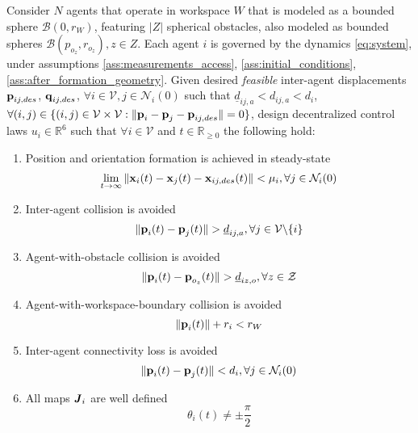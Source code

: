 \begin{bg_box}
\begin{problem}
	Consider $N$ agents that operate in workspace $W$ that is modeled as a bounded
  sphere $\mathcal{B}(0,r_W)$, featuring $|Z|$ spherical obstacles, also modeled
  as bounded spheres $\mathcal{B}(p_{o_z}, r_{o_z}), z \in Z$.
  Each agent $i$ is governed by the dynamics \eqref{eq:system}, under
  assumptions \ref{ass:measurements_access}, \ref{ass:initial_conditions},
  \ref{ass:after_formation_geometry}. Given desired \textit{feasible}
  inter-agent displacements $\bm{\mathbf{p}}_{ij,des}$, $\bm{\mathbf{q}}_{ij,des}$,
  $\forall i \in \mathcal{V}, j \in \mathcal{N}_i(0)$ such that
  $\underline{d}_{ij,a} < d_{ij,a} < d_i$, $\forall (i,j) \in
  \{(i,j) \in \mathcal{V} \times \mathcal{V}:
  \|\bm{\mathbf{p}}_i - \bm{\mathbf{p}}_j - \bm{\mathbf{p}}_{ij,des}\| = 0\}$,
  design decentralized control laws $u_i \in \mathbb{R}^6$ such that
  $\forall i \in \mathcal{V}$ and $t \in \mathbb{R}_{\geq 0}$ the following
  hold:

  \begin{enumerate}

    \item Position and orientation formation is achieved in steady-state
      $$\lim_{t \to \infty} \|\bm{\mathbf{x}}_i(t) - \bm{\mathbf{x}}_j(t) - \bm{\mathbf{x}}_{ij,des}(t)\| < \mu_i,
        \forall j \in \mathcal{N}_i(0)$$

    \item Inter-agent collision is avoided
      $$\|\bm{\mathbf{p}}_i(t) - \bm{\mathbf{p}}_j(t)\| > \underline{d}_{ij,a},
      \forall j \in \mathcal{V} \backslash \{i\}$$

    \item Agent-with-obstacle collision is avoided
      $$\|\bm{\mathbf{p}}_i(t) - \bm{\mathbf{p}}_{o_z}(t)\| > \underline{d}_{iz,o},
      \forall z \in \mathcal{Z}$$

    \item Agent-with-workspace-boundary collision is avoided
      $$\|\bm{\mathbf{p}}_i(t)\| + r_i < r_W$$

    \item Inter-agent connectivity loss is avoided
      $$\|\bm{\mathbf{p}}_i(t) - \bm{\mathbf{p}}_j(t)\| < d_i,
      \forall j \in \mathcal{N}_i(0)$$

    \item All maps $\bm{\mathit{J}}_i$ are well defined
      $$\theta_i(t) \ne \pm \frac{\pi}{2}$$

  \end{enumerate}
\label{problem}
\end{problem}
\end{bg_box}
